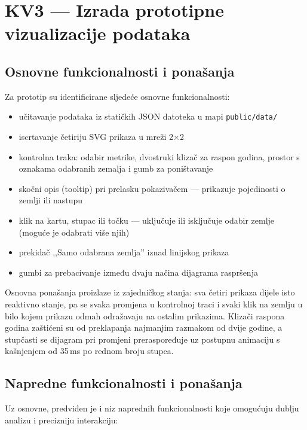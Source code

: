 \documentclass[a4paper,11pt]{article}
\newcommand{\kv}[2]{\clearpage\section{KV#1 --- #2}}
\begin{document}
\kv{3}{Izrada prototipne vizualizacije podataka}

\subsection{Osnovne funkcionalnosti i ponašanja}

Za prototip su identificirane sljedeće osnovne funkcionalnosti:

\begin{itemize}
  \item učitavanje podataka iz statičkih JSON datoteka u mapi \texttt{public/data/}
  \item iscrtavanje četiriju SVG prikaza u mreži 2$\times$2
  \item kontrolna traka: odabir metrike, dvostruki klizač za raspon godina, prostor s oznakama odabranih zemalja i gumb za poništavanje
  \item skočni opis (tooltip) pri prelasku pokazivačem --- prikazuje pojedinosti o zemlji ili nastupu
  \item klik na kartu, stupac ili točku --- uključuje ili isključuje odabir zemlje (moguće je odabrati više njih)
  \item prekidač ,,Samo odabrana zemlja'' iznad linijskog prikaza
  \item gumbi za prebacivanje između dvaju načina dijagrama raspršenja
\end{itemize}

Osnovna ponašanja proizlaze iz zajedničkog stanja: sva četiri prikaza dijele isto reaktivno stanje, pa se svaka promjena u kontrolnoj traci i svaki klik na zemlju u bilo kojem prikazu odmah odražavaju na ostalim prikazima. Klizači raspona godina zaštićeni su od preklapanja najmanjim razmakom od dvije godine, a stupčasti se dijagram pri promjeni preraspoređuje uz postupnu animaciju s kašnjenjem od 35\,ms po rednom broju stupca.

\subsection{Napredne funkcionalnosti i ponašanja}

Uz osnovne, predviđen je i niz naprednih funkcionalnosti koje omogućuju dublju analizu i precizniju interakciju:
\end{document}

